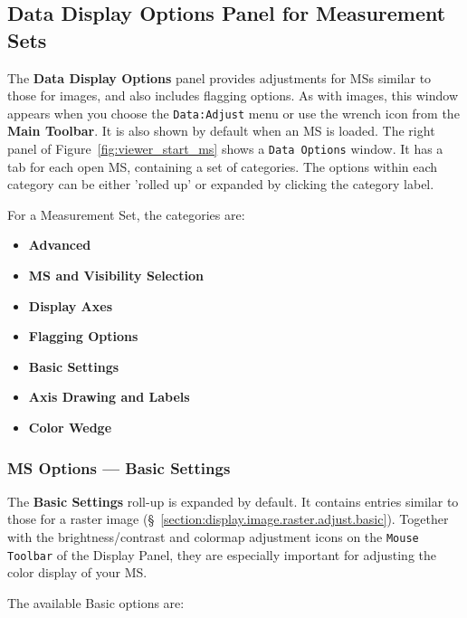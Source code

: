 \subsection{Data Display Options Panel for Measurement Sets}
\label{section:display.ms.adjust}

The {\bf Data Display Options} panel provides adjustments for MSs
similar to those for images, and also includes flagging options.
As with images, this window appears when you choose the {\tt Data:Adjust}
menu or use the wrench icon from the {\bf Main Toolbar}. It is also shown
by default when an MS is loaded. The right panel
of Figure~\ref{fig:viewer_start_ms} shows a {\tt Data Options} window. 
It has a tab for each open MS, containing a set of categories.  The
options within each category can be either 'rolled up' or expanded by
clicking the category label.

For a Measurement Set, the categories are:
\begin{itemize}
   \item {\bf Advanced}
   \item {\bf MS and Visibility Selection}
   \item {\bf Display Axes}
   \item {\bf Flagging Options}
   \item {\bf Basic Settings}
   \item {\bf Axis Drawing and Labels}
   \item {\bf Color Wedge}
\end{itemize}


\subsubsection{MS Options --- Basic Settings}
\label{section:display.ms.adjust.basic}

The {\bf Basic Settings} roll-up is expanded by
default.  It contains entries similar to
those for a raster image (\S~\ref{section:display.image.raster.adjust.basic}). 
Together with the brightness/contrast and colormap adjustment icons
on the {\tt Mouse Toolbar} of the Display Panel, they are especially
important for adjusting the color display of your MS.

The available Basic options are:

